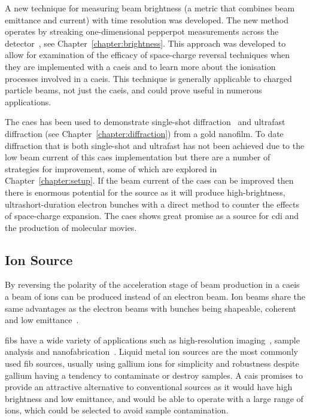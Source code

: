 A new technique for measuring beam brightness (a metric that combines beam emittance and current) with time resolution was developed.
The new method operates by streaking one-dimensional pepperpot measurements across the detector~\cite{torrance_time-resolved_2018}, see Chapter~\ref{chapter:brightness}.
This approach was developed to allow for examination of the efficacy of space-charge reversal techniques when they are implemented with a \gls{caeis} and to learn more about the ionisation processes involved in a \gls{caeis}.
This technique is generally applicable to charged particle beams, not just the \gls{caeis}, and could prove useful in numerous applications.


The \gls{caes} has been used to demonstrate single-shot diffraction~\cite{speirs_single-shot_2015} and ultrafast diffraction (see Chapter~\ref{chapter:diffraction}) from a gold nanofilm.
To date diffraction that is both single-shot and ultrafast has not been achieved due to the low beam current of this \gls{caes} implementation but there are a number of strategies for improvement, some of which are explored in Chapter~\ref{chapter:setup}.
If the beam current of the \gls{caes} can be improved then there is enormous potential for the source as it will produce high-brightness, ultrashort-duration electron bunches with a direct method to counter the effects of space-charge expansion.
The \gls{caes} shows great promise as a source for \gls{cdi} and the production of molecular movies.

\subsection{Ion Source}

By reversing the polarity of the acceleration stage of beam production in a \gls{caeis} a beam of ions can be produced instead of an electron beam.
Ion beams share the same advantages as the electron beams with bunches being shapeable, coherent and low emittance~\cite{knuffman_cold_2013}.

\Glspl{fib} have a wide variety of applications such as high-resolution imaging~\cite{scipioni_helium_2008}, sample analysis and nanofabrication~\cite{khizroev_focused-ion-beam-based_2004}.
Liquid metal ion sources are the most commonly used \gls{fib} sources, usually using gallium ions for simplicity and robustness despite gallium having a tendency to contaminate or destroy samples.
A \gls{cais} promises to provide an attractive alternative to conventional sources as it would have high brightness and low emittance, and would be able to operate with a large range of ions, which could be selected to avoid sample contamination.

